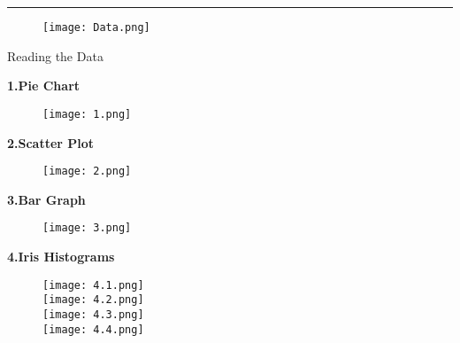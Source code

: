 \documentclass{article}
\title{\color{blue}{ASSIGNMENT 3}}
\author{\Large{\texttt{NAME: \color{red}{C.Anish Kumar}      \color{black}{ID}:\color{red}{B191167}}}}
\begin{document}
\maketitle
\hrule
\vspace{1cm}
\Large\color{black}{DATA: }
\begin{figure}[h]
   \centering
    \texttt{[image: Data.png]}
\end{figure}
\newpage
\Huge{Reading the Data}
\Huge
\vspace{1cm}

\Huge\textbf{1.Pie Chart}
\Large
\begin{figure}[h]
    \centering
    \texttt{[image: 1.png]}
\end{figure}
\newpage

\Huge\textbf{2.Scatter Plot}
\Large
\vspace{10}
\begin{figure}[h]
   \centering
    \texttt{[image: 2.png]}
\end{figure}
\newpage

\Huge\textbf{3.Bar Graph}
\vspace{2cm}
\Large
\newpage


\begin{figure}[h]
   \centering
   \vspace{1cm}
    \texttt{[image: 3.png]}
\end{figure}
\newpage


\Huge\textbf{4.Iris Histograms}
\vspace{3cm}
\Large
\begin{figure}[h]
\centering
    \texttt{[image: 4.1.png]}\\
    \texttt{[image: 4.2.png]}\\
    \texttt{[image: 4.3.png]}\\
    \texttt{[image: 4.4.png]}\\
    
\end{figure}
\end{document}
